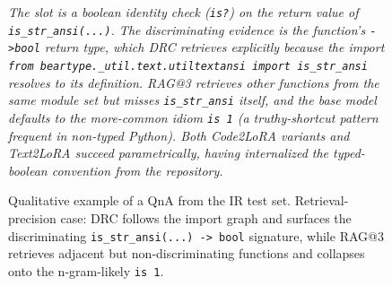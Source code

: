 \documentclass{llmxive}
\providecommand{\codelora}{Code2LoRA\xspace}
\providecommand{\textlora}{Text2LoRA\xspace}
\begin{document}
\begin{figure}[!htbp]
\begin{center}
\begin{tcolorbox}
\vspace{1pt}
{\footnotesize\itshape
The slot is a boolean identity check (\texttt{is\;?}) on the return value of \texttt{is\_str\_ansi(...)}. The discriminating evidence is the function's \texttt{->\;bool} return type, which DRC retrieves explicitly because the import \texttt{from beartype.\_util.text.utiltextansi import is\_str\_ansi} resolves to its definition. RAG@3 retrieves other functions from the same module set but \emph{misses} \texttt{is\_str\_ansi} itself, and the base model defaults to the more-common idiom \texttt{is 1} (a truthy-shortcut pattern frequent in non-typed Python). Both \codelora{} variants and \textlora{} succeed parametrically, having internalized the typed-boolean convention from the repository.
}

\end{tcolorbox}
\caption{Qualitative example of a QnA from the IR test set. Retrieval-precision case: DRC follows the import graph and surfaces the discriminating \texttt{is\_str\_ansi(...) -> bool} signature, while RAG@3 retrieves adjacent but non-discriminating functions and collapses onto the n-gram-likely \texttt{is 1}.}
\label{fig:qualitative_ir_beartype_195}
\end{center}
\end{figure}
\end{document}
